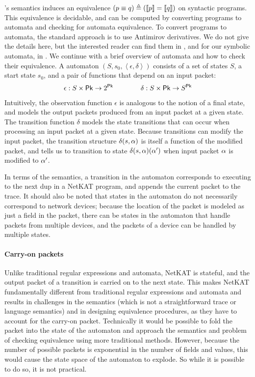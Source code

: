 \documentclass[acmsmall,dvipsnames,nonacm]{acmart}
\begin{document}
\NetKAT's semantics induces an equivalence $(p \equiv q) \triangleq
(\llbracket p \rrbracket = \llbracket q \rrbracket)$ on syntactic programs.  This equivalence is
decidable, and can be computed by converting programs to automata and
checking for automata equivalence. To convert \NetKAT programs to
automata, the standard approach is to use Antimirov derivatives.  We
do not give the details here, but the interested reader can find them
in \cite{Foster2015}, and for our symbolic automata, in
.  We continue with a brief overview of \NetKAT
automata and how to check their equivalence.  A \NetKAT automaton $(S,
s_0, \left<\epsilon, \delta\right>)$ consists of a set of states $S$,
a start state $s_0$, and a pair of functions that depend on an input
packet:
\[
\epsilon : S \times \mathsf{Pk} \to 2^{\mathsf{Pk}} \qquad\qquad  \delta : S\times\mathsf{Pk} \to S^{\mathsf{Pk}}
\]
Intuitively, the observation function $\epsilon$ is analogous to the
notion of a final state, and models the output packets produced from
an input packet at a given state. The transition function $\delta$
models the state transitions that can occur when processing an input
packet at a given state. Because transitions can modify the input
packet, the transition structure $\delta(s,\alpha)$ is itself a function
of the modified packet, and tells us to transition to state
$\delta(s,\alpha)(\alpha')$ when input packet $\alpha$ is modified to $\alpha'$.

In terms of the semantics, a transition in the automaton corresponds
to executing to the next dup in a NetKAT program, and appends the
current packet to the trace.  It should also be noted that states in
the automaton do not necessarily correspond to network devices;
because the location of the packet is modeled as just a field in the
packet, there can be states in the automaton that handle packets from
multiple devices, and the packets of a device can be handled by
multiple states.

\paragraph{Carry-on packets}
Unlike traditional regular expressions and automata, NetKAT is
stateful, and the output packet of a transition is carried on to the
next state.  This makes NetKAT fundamentally different from
traditional regular expressions and automata and results in challenges
in the semantics (which is not a straightforward trace or language
semantics) and in designing equivalence procedures, as they have to
account for the carry-on packet. Technically it would be possible to
fold the packet into the state of the automaton and approach the
semantics and problem of checking equivalence using more traditional
methods. However, because the number of possible packets is
exponential in the number of fields and values, this would cause the
state space of the automaton to explode. So while it is possible to do
so, it is not practical.
\end{document}
